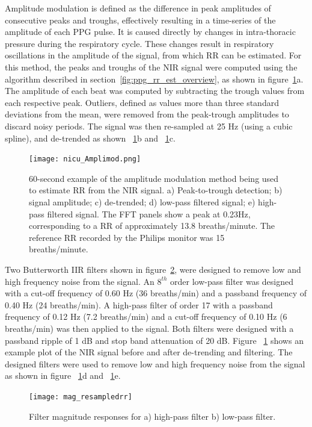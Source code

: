 Amplitude modulation is defined as the difference in peak amplitudes of consecutive peaks and troughs, effectively resulting in a time-series of the amplitude of each PPG pulse.
It is caused directly by changes in intra-thoracic pressure during the respiratory cycle. These changes result in respiratory oscillations in the amplitude of the signal, from which RR can be estimated. 
For this method, the peaks and troughs of the NIR signal were computed using the algorithm described in section~\ref{fig:ppg_rr_est_overview}, as shown in figure~\ref{amplimod}a. The amplitude of each beat was computed by subtracting the trough values from each respective peak. Outliers, defined as values more than three standard deviations from the mean, were removed from the peak-trough amplitudes to discard noisy periods. The signal was then re-sampled at 25 Hz (using a cubic spline), and de-trended as shown ~\ref{amplimod}b and ~\ref{amplimod}c. 


\begin{figure}[!ht]
    \centering
\texttt{[image: nicu\_Amplimod.png]}
    \caption[60-second example of the amplitude modulation method being used to estimate RR from the NIR signal.]{60-second example of the amplitude modulation method being used to estimate RR from the NIR signal. a) Peak-to-trough detection; b) signal amplitude; c) de-trended; d) low-pass filtered signal; e) high-pass filtered signal. The FFT panels show a peak at 0.23Hz, corresponding to a RR of approximately 13.8 breaths/minute. The reference RR recorded by the Philips monitor was 15 breaths/minute.}
    \label{amplimod} 
\end{figure}

Two Butterworth IIR filters shown in figure~\ref{mag_RRresampled}, were designed to remove low and high frequency noise from the signal. An $8^{th}$ order low-pass filter was designed with a cut-off frequency of 0.60 Hz (36 breaths/min) and a passband frequency of 0.40 Hz (24 breaths/min). A high-pass filter of order 17 with a passband frequency of 0.12 Hz (7.2 breaths/min) and a cut-off frequency of 0.10 Hz (6 breaths/min) was then applied to the signal. Both filters were designed with a passband ripple of 1 dB and stop band attenuation of 20 dB. Figure ~\ref{amplimod} shows an example plot of the NIR signal before and after de-trending and filtering. The designed filters were used to remove low and high frequency noise from the signal as shown in figure ~\ref{amplimod}d and ~\ref{amplimod}e. 

\begin{figure}[!ht]
\centering
\texttt{[image: mag\_resampledrr]}
    \caption[Filter magnitude responses.]{Filter magnitude responses for a) high-pass filter b) low-pass filter.}
        \label{mag_RRresampled}
\end{figure}


